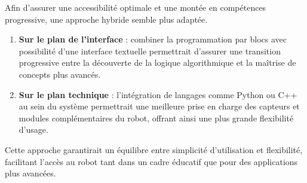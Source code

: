 Afin d’assurer une accessibilité optimale et une montée en compétences progressive, une approche hybride semble plus adaptée. 
\begin{enumerate}
    \item \textbf{Sur le plan de l’interface} : combiner la programmation par blocs avec possibilité d'une interface textuelle permettrait d’assurer une transition progressive entre la découverte de la logique algorithmique et la maîtrise de concepts plus avancés.
    
    \item \textbf{Sur le plan technique} : l’intégration de langages comme Python ou C++ au sein du système permettrait une meilleure prise en charge des capteurs et modules complémentaires du robot, offrant ainsi une plus grande flexibilité d’usage.
\end{enumerate}

Cette approche garantirait un équilibre entre simplicité d’utilisation et flexibilité, facilitant l’accès au robot tant dans un cadre éducatif que pour des applications plus avancées.
